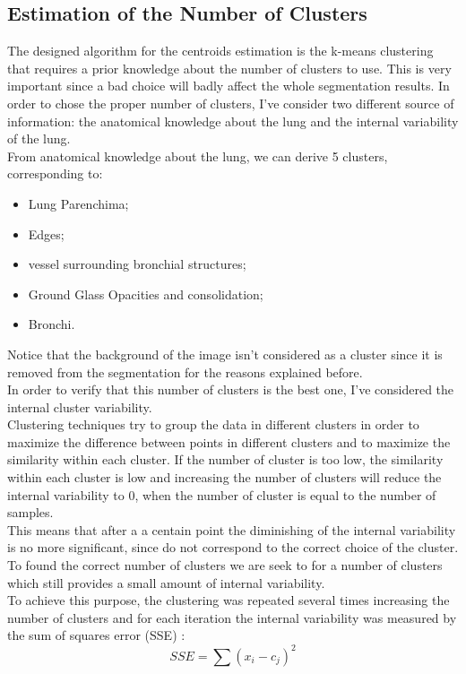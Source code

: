 \documentclass{standalone}
\begin{document}
	\subsection{Estimation of the Number of Clusters}
	
	The designed algorithm for the centroids estimation is the k-means clustering that requires a prior knowledge about the number of clusters to use. This is very important since a bad choice will badly affect the whole segmentation results. In order to chose the proper number of clusters, I've consider two different source of information: the anatomical knowledge about the lung and the internal variability of the lung. \\
	From anatomical knowledge about the lung, we can derive 5 clusters, corresponding to: 
	
	\begin{itemize}
		\item Lung Parenchima; 
		
		\item  Edges;
		
		\item vessel surrounding bronchial structures;
		
		\item  Ground Glass Opacities and consolidation;
		
		\item Bronchi.
	\end{itemize}

	Notice that the background of the image isn't considered as a cluster since it is removed from the segmentation for the reasons explained before.\\
	In order to verify that this number of clusters is the best one, I've considered the internal cluster variability.\\
	Clustering techniques try to group the data in different clusters  in order to maximize the difference between points in different clusters and to maximize the similarity within each cluster.  If the number of cluster is too low, the similarity within each cluster is low and increasing the number of clusters will reduce the internal variability to $0$, when the number of cluster is equal to the number of samples.\\ This means that after a a centain point the diminishing of the internal variability is no more significant, since do not correspond to the correct choice of the cluster.\\
	To found the correct number of clusters we are seek to for a number of clusters which still provides a small amount of internal variability. \\
	To achieve this purpose, the clustering was repeated several times increasing the number of clusters and for each iteration the internal variability was measured by the sum of squares error (SSE) : 
	\begin{equation}\label{eq:SumOfSquare}
		SSE = \sum (x_i - c_j)^2
	\end{equation}
	
\end{document}

